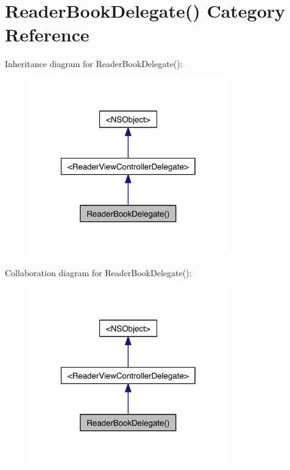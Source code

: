 \hypertarget{category_reader_book_delegate_07_08}{\section{Reader\-Book\-Delegate() Category Reference}
\label{d2/d8f/category_reader_book_delegate_07_08}
}


Inheritance diagram for Reader\-Book\-Delegate()\-:
\nopagebreak
\begin{figure}[H]
\begin{center}
\leavevmode
\includegraphics[width=244pt]{dc/d6e/category_reader_book_delegate_07_08__inherit__graph}
\end{center}
\end{figure}


Collaboration diagram for Reader\-Book\-Delegate()\-:
\nopagebreak
\begin{figure}[H]
\begin{center}
\leavevmode
\includegraphics[width=244pt]{d5/df5/category_reader_book_delegate_07_08__coll__graph}
\end{center}
\end{figure}

